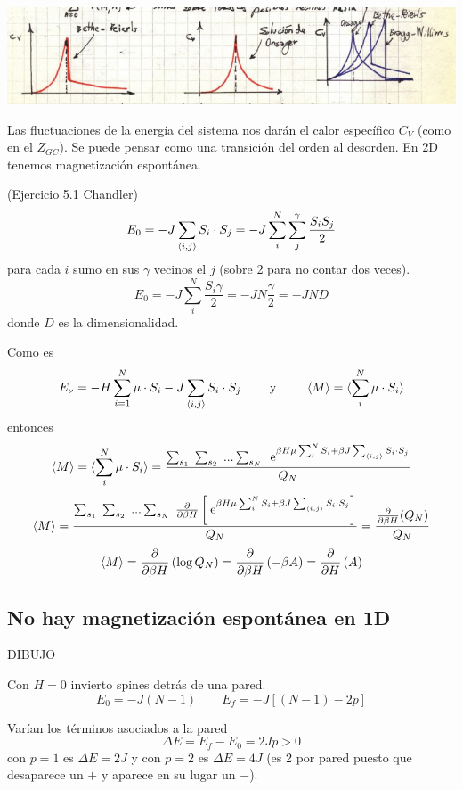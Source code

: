 \documentclass[10pt,oneside]{CBFT_book}
\begin{document}
\includegraphics[scale=0.4]{images/1606337019.jpg}

Las fluctuaciones de la energía del sistema nos darán el calor específico $C_V$ (como en el $Z_{GC}$).
Se puede pensar como una transición del orden al desorden. En 2D tenemos magnetización espontánea.

\begin{ejemplo}{(Ejercicio 5.1 Chandler)}
\[
	E_0 = -J \sum_{\braket{i,j}} S_i \cdot S_j = -J  \sum_i^N \sum_j^\gamma \frac{S_i S_j}{2}
\]
para cada $i$ sumo en sus $\gamma$ vecinos el $j$ (sobre 2 para no contar dos veces).
\[
	E_0 = -J \sum_i^N \frac{S_i\gamma}{2} = -J N\frac{\gamma}{2} = -JND
\]
donde $D$ es la dimensionalidad.
\end{ejemplo}


Como es
\[
	E_\nu =  -H \sum_{i=1}^N \mu \cdot S_i - J \sum_{\braket{i,j}} S_i \cdot S_j \qquad
	\text{ y } \qquad \braket{M} = \braket{ \sum_i^N \mu \cdot S_i }
\]
entonces
\[
	\braket{M} = \braket{ \sum_i^N \mu \cdot S_i } = 
	\frac{ \sum_{s_1} \; \sum_{s_2} \; ... \sum_{s_N} \;
	\:\mathrm{e}^{ \beta H \mu \sum_i^N S_i + \beta J \sum_{\braket{i,j}} S_i \cdot S_j } }{Q_N}
\]
\[
	\braket{M} = \frac{ \sum_{s_1} \; \sum_{s_2} \; ... \sum_{s_N} \;
	\frac{\partial^{\hspace{-0.05em}} {}}{\partial {\beta H}^{\hspace{-0.05em}}} \left[ \:\mathrm{e}^{ \beta H \mu \sum_i^N S_i + \beta J \sum_{\braket{i,j}} S_i \cdot S_j } 
	\right]}{Q_N} = \frac{\frac{\partial^{\hspace{-0.05em}} {}}{\partial {\beta H}^{\hspace{-0.05em}}}(Q_N)}{Q_N}
\]
\[
	\braket{M} = \frac{\partial^{\hspace{-0.05em}} {}}{\partial {\beta H}^{\hspace{-0.05em}}}\left( \log Q_N \right) = \frac{\partial^{\hspace{-0.05em}} {}}{\partial {\beta H}^{\hspace{-0.05em}}}\left( -\beta A \right) =
	\frac{\partial^{\hspace{-0.05em}} {}}{\partial {H}^{\hspace{-0.05em}}}\left( A \right)
\]

\subsection{No hay magnetización espontánea en 1D}


DIBUJO 

Con $H=0$ invierto spines detrás de una pared.
\[
	E_0 = -J(N-1) \qquad E_f = -J[(N-1)-2p]
\]

Varían los términos asociados a la pared
\[
	\Delta E = E_f - E_0 = 2Jp > 0
\]
con $p=1$ es $\Delta E = 2J$ y con $p=2$ es $\Delta E = 4J$ (es 2 por pared puesto que desaparece un $+$ y aparece
en su lugar un $-$).
\end{document}
